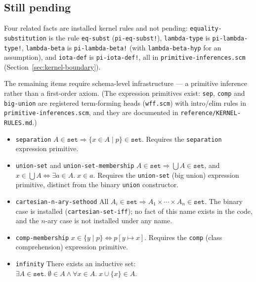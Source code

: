 \subsection*{Still pending}

Four related facts are installed kernel rules and not pending:
\texttt{equality-substitution} is the rule \texttt{eq-subst}
(\texttt{pi-eq-subst!}), \texttt{lambda-type} is \texttt{pi-lambda-type!},
\texttt{lambda-beta} is \texttt{pi-lambda-beta!} (with
\texttt{lambda-beta-hyp} for an assumption), and \texttt{iota-def} is
\texttt{pi-iota-def!}, all in \texttt{primitive-inferences.scm}
(Section~\ref{sec:kernel-boundary}).

The remaining items require schema-level infrastructure --- a primitive
inference rather than a first-order axiom.  (The expression primitives
exist: \texttt{sep},
\texttt{comp} and \texttt{big-union} are registered term-forming heads
(\texttt{wff.scm}) with intro/elim rules in \texttt{primitive-inferences.scm},
and they are documented in \texttt{reference/KERNEL-RULES.md}.)

\begin{itemize}

\item \texttt{separation}
  $A \in \mathtt{set} \Rightarrow \{x \in A \mid p\} \in \mathtt{set}$.
  Requires the \texttt{separation} expression primitive.

\item \texttt{union-set} and \texttt{union-set-membership}
  $A \in \mathtt{set} \Rightarrow \bigcup A \in \mathtt{set}$, and
  $x \in \bigcup A \Leftrightarrow \exists a \in A.\; x \in a$.
  Requires the \texttt{union-set} (big union) expression primitive,
  distinct from the binary \texttt{union} constructor.

\item \texttt{cartesian-n-ary-sethood}
  All $A_i \in \mathtt{set} \Rightarrow A_1 \times \cdots \times A_n \in \mathtt{set}$.
  The binary case is installed (\texttt{cartesian-set-iff}); no fact of this
  name exists in the code, and the $n$-ary case is not installed under any name.

\item \texttt{comp-membership}
  $x \in \{y \mid p\} \Leftrightarrow p[y \mapsto x]$.
  Requires the \texttt{comp} (class comprehension) expression primitive.

\item \texttt{infinity}
  There exists an inductive set:
  $\exists A \in \mathtt{set}.\;\emptyset \in A \land
   \forall x \in A.\; x \cup \{x\} \in A$.

\end{itemize}


